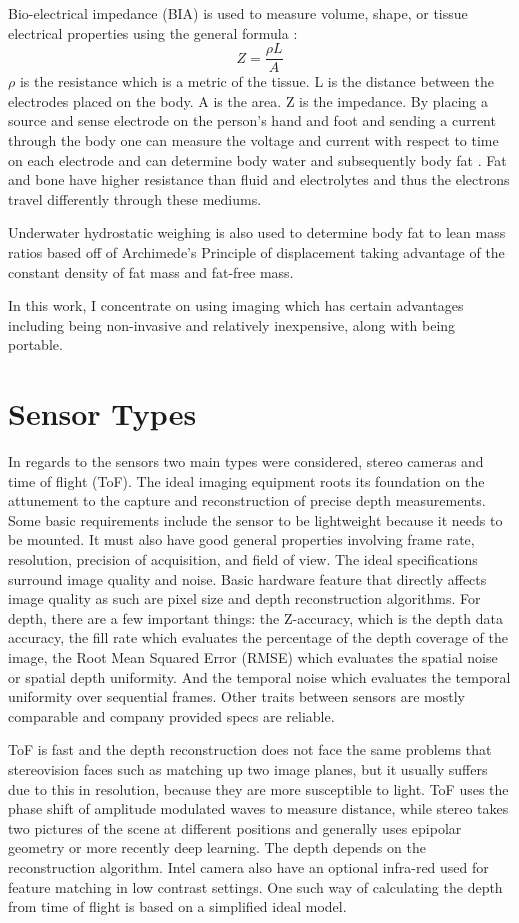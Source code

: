Bio-electrical impedance (BIA) is used to measure volume, shape, or tissue electrical properties using the general formula \cite{jaffrin2008body}:
\begin{equation}
	Z = \frac{\rho L}{A}
\end{equation}
$\rho$ is the resistance which is a metric of the tissue. L is the distance between the electrodes placed on the body. A is the area. Z is the impedance. By placing a source and sense electrode on the person's hand and foot and sending a current through the body one can measure the voltage and current with respect to time on each electrode and can determine body water and subsequently body fat \cite{khalil2014theory}. Fat and bone have higher resistance than fluid and electrolytes and thus the electrons travel differently through these mediums.

Underwater hydrostatic weighing is also used to determine body fat to lean mass ratios based off of Archimede's Principle of displacement taking advantage of the constant density of fat mass and fat-free mass.

In this work, I concentrate on using imaging which has certain advantages including being non-invasive and relatively inexpensive, along with being portable.
\section{Sensor Types}
In regards to the sensors two main types were considered, stereo cameras and time of flight (ToF). The ideal imaging equipment roots its foundation on the attunement to the capture and reconstruction of precise depth measurements. Some basic requirements include the sensor to be lightweight because it needs to be mounted. It must also have good general properties involving frame rate, resolution, precision of
acquisition, and field of view. The ideal specifications surround image quality and noise. Basic hardware feature that directly affects image quality as such are pixel size and depth reconstruction algorithms. For depth, there
are a few important things: the Z-accuracy, which is the depth data accuracy, the fill rate which
evaluates the percentage of the depth coverage of the image, the Root Mean Squared Error (RMSE) which evaluates the
spatial noise or spatial depth uniformity. And the temporal noise which evaluates the temporal
uniformity over sequential frames. Other traits between sensors are mostly comparable and
company provided specs are reliable.

ToF is fast and the depth reconstruction does not face the same problems that stereovision faces such as matching up two image planes, but it usually suffers due to this in resolution, because they are more susceptible to light. ToF uses the phase shift of amplitude modulated waves to measure distance, while stereo takes two pictures of the scene at different positions and generally uses epipolar geometry or more recently deep learning. The depth depends on the reconstruction algorithm. Intel camera also have an optional infra-red used for feature matching in low contrast settings. One such way of calculating the depth from time of flight is based on a simplified ideal model.

